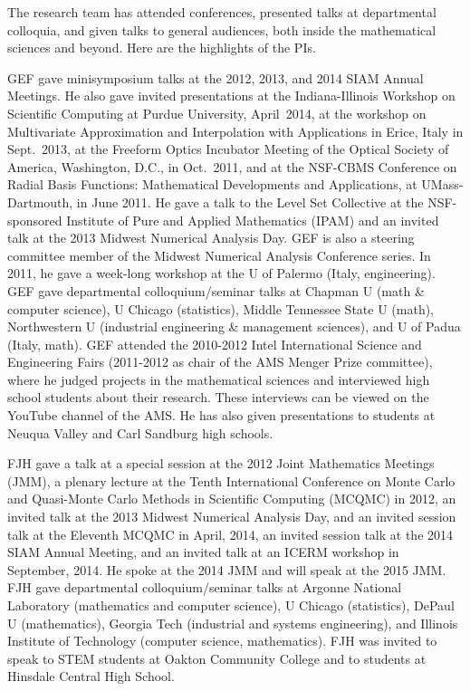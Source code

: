 \documentclass[11pt]{NSFamsart}
\begin{document}
The research team has attended conferences, presented talks at departmental colloquia, and given talks to general audiences, both inside the mathematical sciences and beyond. Here are the highlights of the PIs.

GEF gave minisymposium talks at the 2012, 2013, and 2014 SIAM Annual Meetings.  He also gave invited presentations at the Indiana-Illinois Workshop on Scientific Computing at Purdue University, April~2014, at the workshop on Multivariate Approximation and Interpolation with Applications in Erice, Italy in Sept.~2013, at the Freeform Optics Incubator Meeting of the Optical Society of America, Washington, D.C., in Oct.~2011, and at the NSF-CBMS Conference on Radial Basis Functions: Mathematical Developments and Applications, at UMass-Dartmouth, in June 2011. He gave a talk to the Level Set Collective at the NSF-sponsored Institute of Pure and Applied Mathematics (IPAM) and an invited talk at the 2013 Midwest Numerical Analysis Day. GEF is also a steering committee member of the Midwest Numerical Analysis Conference series. In 2011, he gave a week-long workshop at the U of Palermo (Italy, engineering). GEF gave departmental colloquium/seminar talks at Chapman U (math \& computer science), U Chicago (statistics), Middle Tennessee State U (math), Northwestern U (industrial engineering \& management sciences), and U of Padua (Italy, math).  GEF attended the 2010-2012 Intel International Science and Engineering Fairs (2011-2012 as chair of the AMS Menger Prize committee), where he judged projects in the mathematical sciences and interviewed high school students about their research. These interviews can be viewed on the YouTube channel of the AMS. He has also given presentations to students at Neuqua Valley and Carl Sandburg high schools.

FJH gave a talk at a special session at the 2012 Joint Mathematics Meetings (JMM), a plenary lecture at the Tenth International Conference on Monte Carlo and Quasi-Monte Carlo Methods in Scientific Computing (MCQMC) in 2012, an invited talk at the 2013 Midwest Numerical Analysis Day, and an invited session talk at the Eleventh MCQMC in April, 2014, an invited session talk at the 2014 SIAM Annual Meeting, and an invited talk at an ICERM workshop in September, 2014.  He spoke at the 2014 JMM and will speak at the 2015 JMM. FJH gave departmental colloquium/seminar talks at Argonne National Laboratory (mathematics and computer science), U Chicago (statistics), DePaul U (mathematics), Georgia Tech (industrial and systems engineering), and Illinois Institute of Technology (computer science, mathematics).  FJH was invited to speak to STEM students at Oakton Community College and to students at Hinsdale Central High School.
\end{document}
